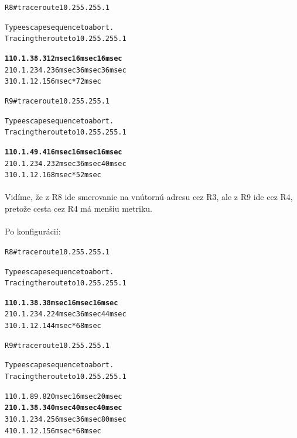 \documentclass[12pt,twoside,a4paper]{report}
\begin{document}
\noindent
{\selectfont
\begin{small}
\begin{alltt}
R8#traceroute 10.255.255.1

Type escape sequence to abort.
Tracing the route to 10.255.255.1

\textbf{  1 10.1.38.3 12 msec 16 msec 16 msec}
  2 10.1.234.2 36 msec 36 msec 36 msec
  3 10.1.12.1 56 msec *  72 msec



R9#traceroute 10.255.255.1

Type escape sequence to abort.
Tracing the route to 10.255.255.1

\textbf{  1 10.1.49.4 16 msec 16 msec 16 msec}
  2 10.1.234.2 32 msec 36 msec 40 msec
  3 10.1.12.1 68 msec *  52 msec

\end{alltt}
\end{small}
}

\paragraph{}
Vidíme, že z R8 ide smerovanie na vnútornú adresu cez R3, ale z R9 ide cez R4, pretože cesta cez R4 má menšiu metriku.



\paragraph{}
Po konfigurácií:

\noindent
{\selectfont
\begin{small}
\begin{alltt}
R8#traceroute 10.255.255.1

Type escape sequence to abort.
Tracing the route to 10.255.255.1

\textbf{  1 10.1.38.3 8 msec 16 msec 16 msec}
  2 10.1.234.2 24 msec 36 msec 44 msec
  3 10.1.12.1 44 msec *  68 msec



R9#traceroute 10.255.255.1

Type escape sequence to abort.
Tracing the route to 10.255.255.1

  1 10.1.89.8 20 msec 16 msec 20 msec
\textbf{  2 10.1.38.3 40 msec 40 msec 40 msec}
  3 10.1.234.2 56 msec 36 msec 80 msec
  4 10.1.12.1 56 msec *  68 msec
\end{alltt}
\end{small}
}
\end{document}
